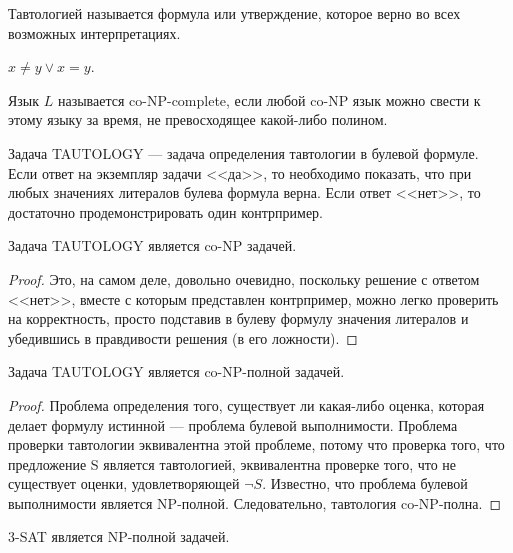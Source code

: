     \begin{Def}[Тавтология]
    Тавтологией называется формула или утверждение, которое верно во всех возможных интерпретациях.
    \end{Def}
    \begin{Example}
        $x \neq y \lor x = y$.
    \end{Example}
    \begin{Def}[co-NP-complete]
    Язык $L$ называется co-NP-complete, если любой co-NP язык можно свести к этому языку за время, не превосходящее какой-либо полином.
    \end{Def}
    \begin{Def}
    Задача TAUTOLOGY --- задача определения тавтологии в булевой формуле. Если ответ на экземпляр задачи <<да>>, то необходимо показать, что при любых значениях литералов булева формула верна. Если ответ <<нет>>, то достаточно продемонстрировать один контрпример.
    \end{Def}
    \begin{Thm}
    Задача TAUTOLOGY является co-NP задачей.
    \end{Thm}
    \begin{proof}
    Это, на самом деле, довольно очевидно, поскольку решение с ответом <<нет>>, вместе с которым представлен контрпример, можно легко проверить на корректность, просто подставив в булеву формулу значения литералов и убедившись в правдивости решения (в его ложности).
    \end{proof}
    \begin{Thm}
    Задача TAUTOLOGY является co-NP-полной задачей.
    \end{Thm}
    \begin{proof}
    Проблема определения того, существует ли какая-либо оценка, которая делает формулу истинной --- проблема булевой выполнимости. Проблема проверки тавтологии эквивалентна этой проблеме, потому что проверка того, что предложение S является тавтологией, эквивалентна проверке того, что не существует оценки, удовлетворяющей $\lnot S$. Известно, что проблема булевой выполнимости является NP-полной. Следовательно, тавтология co-NP-полна. 
    \end{proof}
    \begin{Thm}
        3-SAT является NP-полной задачей.
    \end{Thm}
